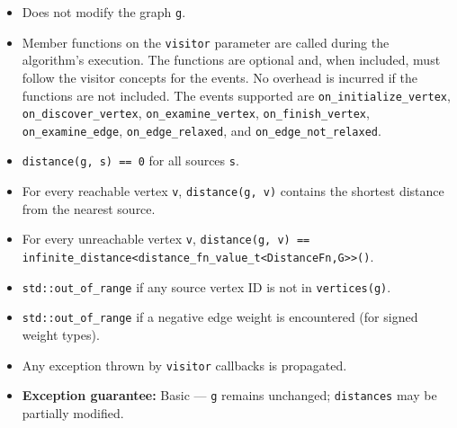 \begin{itemdescr}
\begin{itemize}
                  \item Does not modify the graph \lstinline{g}.
                  \item Member functions on the \lstinline{visitor} parameter are called during the algorithm's execution.
                        The functions are optional and, when included, must follow the visitor concepts for the events.
                        No overhead is incurred if the functions are not included.
                        The events supported are \lstinline{on_initialize_vertex}, \lstinline{on_discover_vertex},
                        \lstinline{on_examine_vertex}, \lstinline{on_finish_vertex}, \lstinline{on_examine_edge},
                        \lstinline{on_edge_relaxed}, and \lstinline{on_edge_not_relaxed}.
            \end{itemize}
      \pnum\postconditions
            \begin{itemize}
                  \item \lstinline{distance(g, s) == 0} for all sources \lstinline{s}.
                  \item For every reachable vertex \lstinline{v}, \lstinline{distance(g, v)} contains the
                        shortest distance from the nearest source.
                  \item For every unreachable vertex \lstinline{v},
                        \lstinline{distance(g, v) == infinite_distance<distance_fn_value_t<DistanceFn,G>>()}.
            \end{itemize}
      \pnum\throws
            \begin{itemize}
                  \item \lstinline{std::out_of_range} if any source vertex ID is not in \lstinline{vertices(g)}.
                  \item \lstinline{std::out_of_range} if a negative edge weight is encountered
                        (for signed weight types).
                  \item Any exception thrown by \lstinline{visitor} callbacks is propagated.
                  \item \textbf{Exception guarantee:} Basic --- \lstinline{g} remains unchanged;
                        \lstinline{distances} may be partially modified.
            \end{itemize}
      \pnum\complexity

\end{itemdescr}
